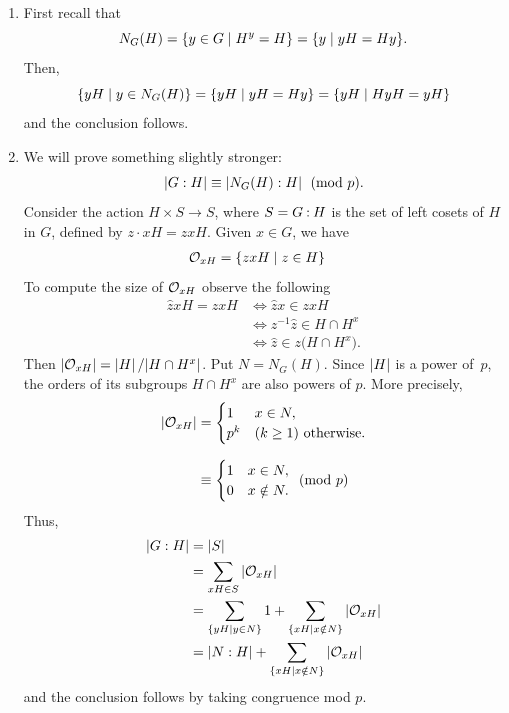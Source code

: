 \begin{solution}
\begin{enumerate}[\upshape a)]
    \item First recall that
    $$
        N_G(H) = \{y\in G \mid H^y=H\} = \{y\mid yH=Hy\}.
    $$
    Then,
    $$
        \{yH\mid y\in N_G(H)\} = \{yH\mid yH=Hy\} = \{yH\mid HyH= yH\}
    $$
    and the conclusion follows.

    \item We will prove something slightly stronger:
    $$
        \left\vert{G:H}\right\vert \equiv \left\vert{N_G(H):H}\right\vert\pmod p.
    $$
    Consider the action $H\times S\to S$, where $S=G\mathbin:H$ is the set of left cosets of $H$ in $G$, defined by $z\cdot xH = zxH$. Given $x\in G$, we have
    \begin{align*}
        {\cal O}_{xH} &= \{zxH\mid z\in H\}
    \end{align*}
    To compute the size of ${\cal O}_{xH}$ observe the following
    \begin{align*}
        \hat zxH = zxH &\iff \hat zx\in zxH\\
            &\iff z^{-1}\hat z\in H\cap H^x\\
            &\iff \hat z\in z\big(H\cap H^x\big).
    \end{align*}
    Then $\left\vert{{\cal O}_{xH}}\right\vert=\left\vert{H}\right\vert/|H\cap H^x|$. Put $N=N_G(H)$. Since $\left\vert{H}\right\vert$ is a power of~$p$, the orders of its subgroups $H\cap H^x$ are also powers of $p$. More precisely,
    \begin{align*}
        \left\vert{{\cal O}_{xH}}\right\vert &=
            \begin{cases}
                1   &x\in N,\\
                p^{k} &(k\ge1)\textrm{ otherwise}.
            \end{cases}\\[0.1in]
            &\equiv
           \begin{cases}
                1 &x\in N,\\
                0 &x\notin N.
            \end{cases}\pmod p
        \end{align*}
    Thus,
    \begin{align*}
        \left\vert{G:H}\right\vert &= \left\vert{S}\right\vert\\
                &= \sum_{xH\in S}\left\vert{{\cal O}_{xH}}\right\vert\\
                &=\sum_{\{yH\mid y\in N\}}1
                    + \sum_{\{xH\mid x\notin N\}}\left\vert{{\cal O}_{xH}}\right\vert\\
                &= \left\vert{N:H}\right\vert + \sum_{\{xH\mid x\notin N\}}\left\vert{{\cal O}_{xH}}\right\vert
    \end{align*}
    and the conclusion follows by taking congruence mod $p$.
\end{enumerate}
\end{solution}

